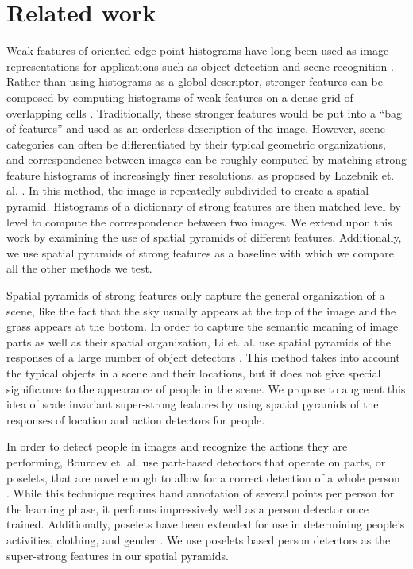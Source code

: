 \documentclass[11pt]{article}
\begin{document}
\section{Related work}

Weak features of oriented edge point histograms have long been used as image representations for applications such as object detection and scene recognition \cite{sift} \cite{gist}. Rather than using histograms as a global descriptor, stronger features can be composed by computing histograms of weak features on a dense grid of overlapping cells \cite{HOG}. Traditionally, these stronger features would be put into a ``bag of features'' and used as an orderless description of the image. However, scene categories can often be differentiated by their typical geometric organizations, and correspondence between images can be roughly computed by matching strong feature histograms of increasingly finer resolutions, as proposed by Lazebnik et. al. \cite{beyond_bags}. In this method, the image is repeatedly subdivided to create a spatial pyramid. Histograms of a dictionary of strong features are then matched level by level to compute the correspondence between two images. We extend upon this work by examining the use of spatial pyramids of different features. Additionally, we use spatial pyramids of strong features as a baseline with which we compare all the other methods we test. 

Spatial pyramids of strong features only capture the general organization of a scene, like the fact that the sky usually appears at the top of the image and the grass appears at the bottom. In order to capture the semantic meaning of image parts as well as their spatial organization, Li et. al. use spatial pyramids of the responses of a large number of object detectors \cite{object_bank}. This method takes into account the typical objects in a scene and their locations, but it does not give special significance to the appearance of people in the scene. We propose to augment this idea of scale invariant super-strong features by using spatial pyramids of the responses of location and action detectors for people. 	

In order to detect people in images and recognize the actions they are performing, Bourdev et. al. use part-based detectors that operate on parts, or poselets, that are novel enough to allow for a correct detection of a whole person \cite{poselets}. While this technique requires hand annotation of several points per person for the learning phase, it performs impressively well as a person detector once trained. Additionally, poselets have been extended for use in determining people's activities, clothing, and gender \cite{poselets_actions}. We use poselets based person detectors as the super-strong features in our spatial pyramids.
\end{document}
